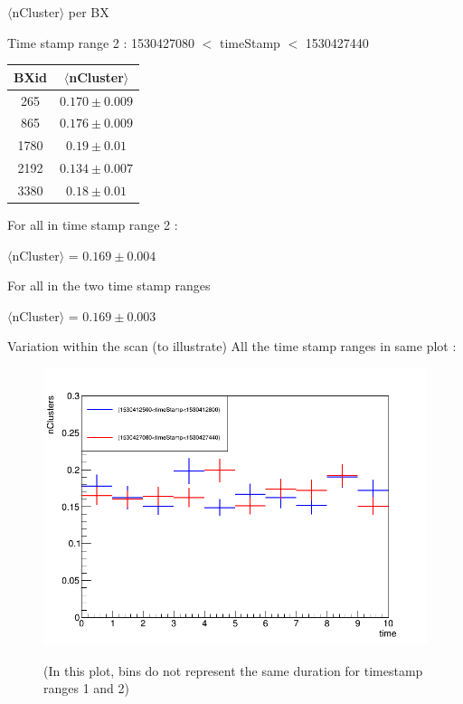 \documentclass{beamer}
\begin{document}
	\begin{frame}
		\begin{block}{$\langle$nCluster$\rangle$ per BX}
			\begin{center}
				Time stamp range 2 : 1530427080 $<$ timeStamp $<$ 1530427440
				\newline
				\newline
				\begin{tabular}{|c|c|}
					\hline
					BXid  & $\langle$nCluster$\rangle$  \\
					\hline
					265 & $0.170 \pm 0.009$ \\
					865 & $0.176 \pm 0.009$\\
					1780 & $0.19 \pm 0.01$\\
					2192 & $0.134 \pm 0.007$\\
					3380 & $0.18 \pm 0.01$\\
					\hline
				\end{tabular}
			\end{center}
				For all in time stamp range 2 :\begin{center}
			$\langle$nCluster$\rangle$ = $0.169 \pm 0.004$
		\end{center}
		\end{block}
		\begin{block}{For all in the two time stamp ranges}
			\begin{center}
			$\langle$nCluster$\rangle$ =	$0.169 \pm 0.003$
			\end{center}
		\end{block}
	\end{frame}	

	\begin{frame}
		\begin{block}{Variation within the scan (to illustrate)}
			All the time stamp ranges in same plot : 
			\begin{figure}[H!]
				\begin{center}
					\includegraphics[scale=1]{nClusterBin.png}
				\end{center}
				\tiny{(In this plot, bins do not represent the same duration for timestamp ranges 1 and 2)}
			\end{figure}
		\end{block}
	\end{frame}
\end{document}
